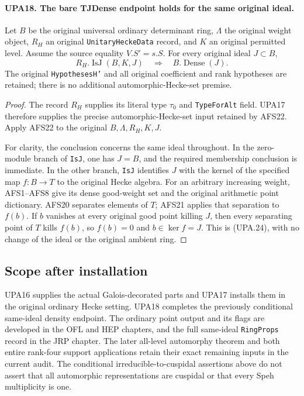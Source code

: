 \documentclass[11pt,a4paper]{article}
\numberwithin{equation}{section}
\theoremstyle{remark}\newtheorem{remark}[theorem]{Remark}
\begin{document}
\paragraph{UPA18. The bare TJDense endpoint holds for the same original ideal.}
\label{claim:UPA18}
Let $B$ be the original universal ordinary determinant
ring, $\Lambda$ the original weight object, $R_H$ an
original \texttt{Unitary\allowbreak Hecke\allowbreak Data} record, and $K$ an
original permitted level.  Assume the source equality
$V.S'=s.S$.  For every original ideal $J\subset B$,
\[
                  R_H.\operatorname{IsJ}(B,K,J)
                         \quad\Longrightarrow\quad
                  B.\operatorname{Dense}(J).
 \tag{UPA.24}
\]
The original \texttt{Hypotheses\allowbreak H'} and all original
coefficient and rank hypotheses are retained; there
is no additional automorphic-Hecke-set premise.
\begin{proof}
The record $R_H$ supplies its literal type
$\tau_0$ and \texttt{Type\allowbreak For\allowbreak Alt} field.  UPA17
therefore supplies the precise automorphic-Hecke-set
input retained by AFS22.  Apply AFS22 to the original
$B,\Lambda,R_H,K,J$.

For clarity, the conclusion concerns the same ideal
throughout.  In the zero-module branch of
\texttt{Is\allowbreak J}, one has $J=B$, and the required membership
conclusion is immediate.  In the other branch,
\texttt{Is\allowbreak J} identifies $J$ with the kernel of the
specified map $f:B\to T$ to the original Hecke algebra.
For an arbitrary increasing weight, AFS1--AFS8 give
its dense good-weight set and the original arithmetic
point dictionary.  AFS20 separates elements of $T$;
AFS21 applies that separation to $f(b)$.
If $b$ vanishes at every original good point killing
$J$, then every separating point of $T$ kills $f(b)$,
so $f(b)=0$ and $b\in\ker f=J$.
This is (UPA.24), with no change of the ideal or
the original ambient ring.
\end{proof}

\subsection{Scope after installation}

UPA16 supplies the actual Galois-decorated parts and
UPA17 installs them in the original ordinary Hecke setting.
UPA18 completes the previously conditional same-ideal density
endpoint.  The ordinary point output and its flags are developed
in the OFL and HEP chapters, and the full same-ideal
\texttt{Ring\allowbreak Props} record in the JRP chapter.  The later all-level
automorphy theorem and both entire rank-four support applications
retain their exact remaining inputs in the current audit.
The conditional irreducible-to-cuspidal assertions above
do not assert that all automorphic representations are
cuspidal or that every Speh multiplicity is one.
\end{document}
